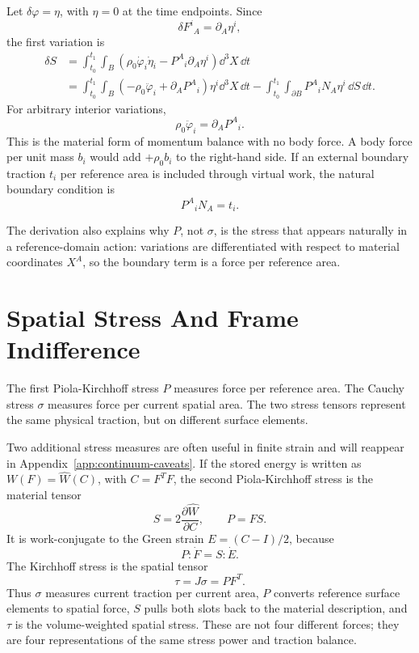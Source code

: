 \begin{derivation}
Let \(\delta\varphi=\eta\), with \(\eta=0\) at the time endpoints. Since
\[
  \delta F^i{}_A=\partial_A\eta^i,
\]
the first variation is
\[
\begin{aligned}
  \delta S
  &=
  \int_{t_0}^{t_1}\int_B
  \left(
    \rho_0\dot\varphi_i\dot\eta_i
    -
    P^A{}_i\partial_A\eta^i
  \right)\dd^3X\,\dd t\\
  &=
  \int_{t_0}^{t_1}\int_B
  \left(
    -\rho_0\ddot\varphi_i
    +
    \partial_A P^A{}_i
  \right)\eta^i\dd^3X\,\dd t
  -
  \int_{t_0}^{t_1}\int_{\partial B}
  P^A{}_iN_A\eta^i\,\dd S\,\dd t.
\end{aligned}
\]
For arbitrary interior variations,
\[
  \boxed{
  \rho_0\ddot\varphi_i=\partial_A P^A{}_i.
  }
\]
This is the material form of momentum balance with no body force. A body force
per unit mass \(b_i\) would add \(+\rho_0b_i\) to the right-hand side. If an
external boundary traction \(t_i\) per reference area is included through
virtual work, the natural boundary condition is
\[
  P^A{}_iN_A=t_i.
\]
\end{derivation}

The derivation also explains why \(P\), not \(\sigma\), is the stress that
appears naturally in a reference-domain action: variations are differentiated
with respect to material coordinates \(X^A\), so the boundary term is a force
per reference area.

\section{Spatial Stress And Frame Indifference}
\label{sec:spatial-stress-frame-indifference}

The first Piola-Kirchhoff stress \(P\) measures force per reference area. The
Cauchy stress \(\sigma\) measures force per current spatial area. The two
stress tensors represent the same physical traction, but on different surface
elements.

Two additional stress measures are often useful in finite strain and will
reappear in Appendix~\ref{app:continuum-caveats}. If the stored energy is
written as \(W(F)=\widehat W(C)\), with \(C=F^TF\), the second
Piola-Kirchhoff stress is the material tensor
\[
  S=2\frac{\partial \widehat W}{\partial C},
  \qquad
  P=F S .
\]
It is work-conjugate to the Green strain \(E=(C-I)/2\), because
\[
  P:\dot F=S:\dot E .
\]
The Kirchhoff stress is the spatial tensor
\[
  \tau=J\sigma=P F^T .
\]
Thus \(\sigma\) measures current traction per current area, \(P\) converts
reference surface elements to spatial force, \(S\) pulls both slots back to the
material description, and \(\tau\) is the volume-weighted spatial stress. These
are not four different forces; they are four representations of the same stress
power and traction balance.

